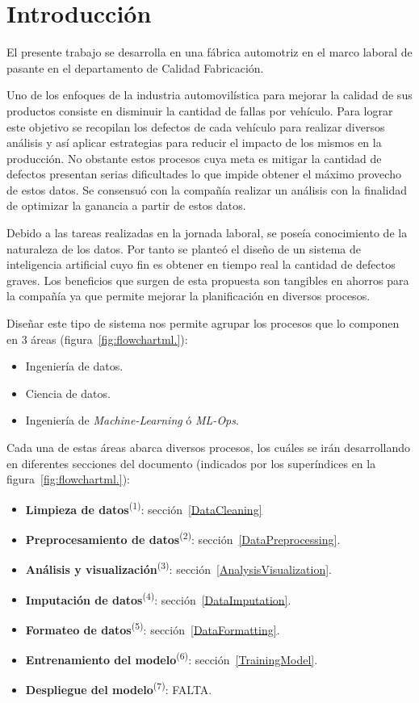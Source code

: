 \documentclass[a4paper,12pt]{article}
\begin{document}
\section{Introducción}
El presente trabajo se desarrolla en una fábrica automotriz en el marco laboral de pasante en el departamento de Calidad Fabricación.

Uno de los enfoques de la industria automovilística para mejorar la calidad de sus productos consiste en disminuir la cantidad de fallas por vehículo. Para lograr este objetivo se recopilan los defectos de cada vehículo para realizar diversos análisis y así aplicar estrategias para reducir el impacto de los mismos en la producción. No obstante estos procesos cuya meta es mitigar la cantidad de defectos presentan serias dificultades lo que impide obtener el máximo provecho de estos datos. Se consensuó con la compañía realizar un análisis con la finalidad de optimizar la ganancia a partir de estos datos.

Debido a las tareas realizadas en la jornada laboral, se poseía conocimiento de la naturaleza de los datos. Por tanto se planteó el diseño de un sistema de inteligencia artificial cuyo fin es obtener en tiempo real la cantidad de defectos graves. Los beneficios que surgen de esta propuesta son tangibles en ahorros para la compañía ya que permite mejorar la planificación en diversos procesos.

Diseñar este tipo de sistema nos permite agrupar los procesos que lo componen en 3 áreas (figura~\ref{fig:flowchartml.}):
\begin{itemize}[noitemsep, topsep=2pt]
	\item Ingeniería de datos.
	\item Ciencia de datos.
	\item Ingeniería de \textit{Machine-Learning} ó \textit{ML-Ops}.
\end{itemize}

Cada una de estas áreas abarca diversos procesos, los cuáles se irán desarrollando en diferentes secciones del documento (indicados por los superíndices en la figura~\ref{fig:flowchartml.}):
\begin{itemize}
	\item \textbf{Limpieza de datos}\textsuperscript{(1)}: sección~\ref{DataCleaning}
	\item \textbf{Preprocesamiento de datos}\textsuperscript{(2)}: sección~\ref{DataPreprocessing}.
	\item \textbf{Análisis y visualización}\textsuperscript{(3)}: sección~\ref{AnalysisVisualization}.
	\item \textbf{Imputación de datos}\textsuperscript{(4)}: sección~\ref{DataImputation}.
	\item \textbf{Formateo de datos}\textsuperscript{(5)}: sección~\ref{DataFormatting}.
	\item \textbf{Entrenamiento del modelo}\textsuperscript{(6)}: sección~\ref{TrainingModel}.
	\item \textbf{Despliegue del modelo}\textsuperscript{(7)}: FALTA.
\end{itemize}
\end{document}
